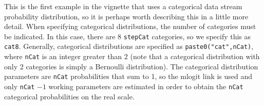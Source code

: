 \documentclass[12pt]{article}\usepackage[]{graphicx}\usepackage[]{xcolor}
\begin{document}
\noindent This is the first example in the vignette that uses a categorical data stream probability distribution, so it is perhaps worth describing this in a little more detail. When specifying categorical distributions, the number of categories must be indicated. In this case, there are 8 \verb|stepCat| categories, so we specify this as \verb|cat8|. Generally, categorical distributions are specified as \verb|paste0("cat",nCat)|, where \verb|nCat| is an integer greater than 2 (note that a categorical distribution with only 2 categories is simply a Bernoulli distribution). The categorical distribution parameters are \verb|nCat| probabilities that sum to 1, so the mlogit link is used and only \verb|nCat| $-1$ working parameters are estimated in order to obtain the \verb|nCat| categorical probabilities on the real scale.
\end{document}
